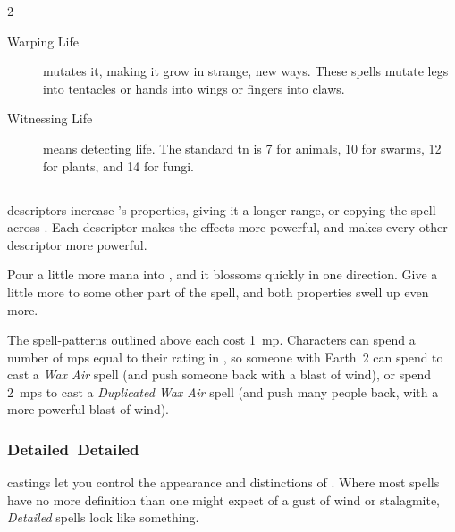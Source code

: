 \begin{multicols}{2}
\begin{description}
  \item[Warping Life]
  mutates it, making it grow in strange, new ways.
  These \glspl{spell} mutate legs into tentacles or hands into wings or fingers into claws.

  \item[Witnessing Life]
  means detecting life.
  The standard \gls{tn} is 7 for animals, 10 for \glspl{swarm}, 12 for plants, and 14 for fungi.
\end{description}


\subsection{}
\label{spellDescriptors}
\Glspl{descriptor} increase 's properties, giving it a longer range, or copying the \gls{spell} across .
Each \gls{descriptor} makes the effects more powerful, and makes every other \gls{descriptor} more powerful.

Pour a little more mana into , and it blossoms quickly in one direction.
Give a little more to some other part of the \gls{spell}, and both properties swell up even more.

The \gls{spell}-patterns outlined above each cost 1~\gls{mp}.
Characters can spend a number of \glspl{mp} equal to their rating in , so someone with Earth~2 can spend  to cast a \textit{Wax Air} \gls{spell} (and push someone back with a blast of wind), or spend 2~\glspl{mp} to cast a \textit{Duplicated Wax Air} \gls{spell} (and push many people back, with a more powerful blast of wind).

\subsubsection[Detailed]{\gls{Detailed}~Detailed}
\glspl{casting} let you control the appearance and distinctions of .
Where most \glspl{spell} have no more definition than one might expect of a gust of wind or stalagmite, \textit{Detailed} \glspl{spell} look like something.


\end{multicols}
